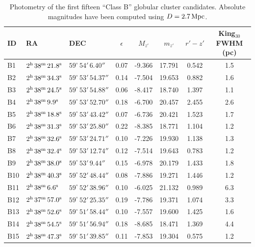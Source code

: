 \documentclass[useAMS,usenatbib]{mn2e}
\begin{document}
\begin{table}
 \centering
  \caption{Photometry of the first fifteen ``Class B'' globular cluster candidates. Absolute magnitudes have been computed using $D = 2.7\,\rm{Mpc}$.}
\label{tab:class_b}  
\begin{tabular}{lllccccc}
	\hline
	ID & RA & DEC & $\epsilon$ & $M_{z'}$ & $m_{z'}$ & $r'-z'$ & King$_{30}$ FWHM (pc) \\
	\hline
	B1 & $2^{\rm{h}}\,38^{\rm{m}}\,21.8^{\rm{s}}$ & $59^\circ\,54'\,6.40''$ & 0.07 & -9.366 & 17.791 & 0.542 & 1.5 \\
	B2 & $2^{\rm{h}}\,38^{\rm{m}}\,34.3^{\rm{s}}$ & $59^\circ\,53'\,54.37''$ & 0.14 & -7.504 & 19.653 & 0.882 & 1.6 \\
	B3 & $2^{\rm{h}}\,38^{\rm{m}}\,24.5^{\rm{s}}$ & $59^\circ\,53'\,54.88''$ & 0.06 & -8.417 & 18.740 & 1.397 & 1.1 \\
	B4 & $2^{\rm{h}}\,38^{\rm{m}}\,9.9^{\rm{s}}$ & $59^\circ\,53'\,52.70''$ & 0.18 & -6.700 & 20.457 & 2.455 & 2.6 \\
	B5 & $2^{\rm{h}}\,38^{\rm{m}}\,18.8^{\rm{s}}$ & $59^\circ\,53'\,43.42''$ & 0.07 & -6.736 & 20.421 & 1.523 & 1.7 \\
	B6 & $2^{\rm{h}}\,38^{\rm{m}}\,31.3^{\rm{s}}$ & $59^\circ\,53'\,25.80''$ & 0.22 & -8.385 & 18.771 & 1.104 & 1.2 \\
	B7 & $2^{\rm{h}}\,38^{\rm{m}}\,32.6^{\rm{s}}$ & $59^\circ\,53'\,24.71''$ & 0.10 & -7.226 & 19.930 & 1.138 & 1.3 \\
	B8 & $2^{\rm{h}}\,38^{\rm{m}}\,32.4^{\rm{s}}$ & $59^\circ\,53'\,12.74''$ & 0.12 & -7.514 & 19.643 & 0.783 & 1.2 \\
	B9 & $2^{\rm{h}}\,38^{\rm{m}}\,38.0^{\rm{s}}$ & $59^\circ\,53'\,9.44''$ & 0.15 & -6.978 & 20.179 & 1.433 & 1.8 \\
	B10 & $2^{\rm{h}}\,38^{\rm{m}}\,40.3^{\rm{s}}$ & $59^\circ\,52'\,48.44''$ & 0.08 & -7.886 & 19.271 & 1.446 & 1.2 \\
	B11 & $2^{\rm{h}}\,38^{\rm{m}}\,6.6^{\rm{s}}$ & $59^\circ\,52'\,38.96''$ & 0.10 & -6.025 & 21.132 & 0.989 & 6.3 \\
	B12 & $2^{\rm{h}}\,37^{\rm{m}}\,57.0^{\rm{s}}$ & $59^\circ\,52'\,25.35''$ & 0.19 & -7.786 & 19.371 & 1.074 & 3.3 \\
	B13 & $2^{\rm{h}}\,38^{\rm{m}}\,52.6^{\rm{s}}$ & $59^\circ\,51'\,58.44''$ & 0.10 & -7.557 & 19.600 & 1.425 & 1.6 \\
	B14 & $2^{\rm{h}}\,38^{\rm{m}}\,54.5^{\rm{s}}$ & $59^\circ\,51'\,56.94''$ & 0.18 & -8.685 & 18.471 & 1.369 & 4.4 \\
	B15 & $2^{\rm{h}}\,38^{\rm{m}}\,47.3^{\rm{s}}$ & $59^\circ\,51'\,39.85''$ & 0.11 & -7.853 & 19.304 & 0.575 & 1.2 \\
	\hline
\end{tabular}
\end{table}



\label{lastpage}
\end{document}

